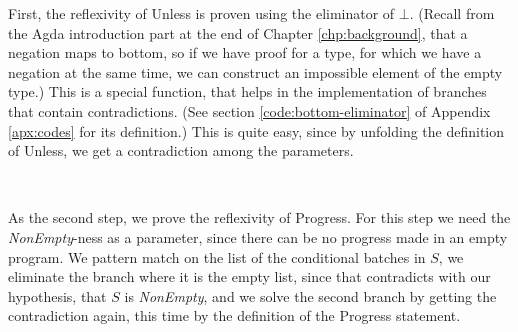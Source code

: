 First, the reflexivity of Unless is proven using the eliminator of $\bot$. (Recall from the Agda introduction part at the end of Chapter \ref{chp:background}, that a negation maps to bottom, so if we have proof for a type, for which we have a negation at the same time, we can construct an impossible element of the empty type.) This is a special function, that helps in the implementation of branches that contain contradictions. (See section \ref{code:bottom-eliminator} of Appendix \ref{apx:codes} for its definition.) This is quite easy, since by unfolding the definition of Unless, we get a contradiction among the parameters.

\begin{code}
    \>[2]\AgdaSpace{}%
    \AgdaSymbol{:}\AgdaSpace{}%
    \AgdaSpace{}%
    \AgdaOperator{\AgdaFunction{▷[}}\AgdaSpace{}%
    \AgdaSpace{}%
    \AgdaOperator{\AgdaFunction{]}}\AgdaSpace{}%
    \<%
    \\
    \>[2]\AgdaSpace{}%
    \AgdaSymbol{(}\AgdaSpace{}%
    \AgdaOperator{\AgdaInductiveConstructor{,}}\AgdaSpace{}%
    \AgdaSymbol{)}\AgdaSpace{}%
    \AgdaSymbol{=}\AgdaSpace{}%
    \AgdaSpace{}%
    \AgdaSymbol{(}\AgdaSpace{}%
    \AgdaSymbol{)}\<%
\end{code}

As the second step, we prove the reflexivity of Progress. For this step we need the \textit{NonEmpty}-ness as a parameter, since there can be no progress made in an empty program.
We pattern match on the list of the conditional batches in $S$, we eliminate the branch where it is the empty list, since that contradicts with our hypothesis, that $S$ is \textit{NonEmpty}, and we solve the second branch by getting the contradiction again, this time by the definition of the Progress statement.

